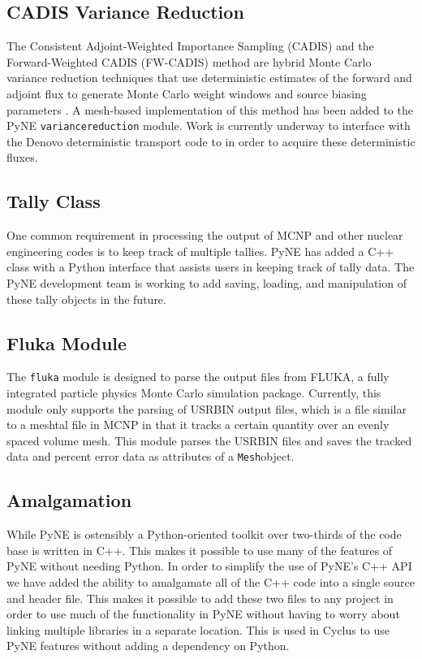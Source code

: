 \documentclass{anstrans}
\newcommand{\Mesh}{\texttt{Mesh}}
\begin{document}
\subsection{CADIS Variance Reduction}

The Consistent Adjoint-Weighted Importance Sampling (CADIS) and the
Forward-Weighted CADIS (FW-CADIS) method are hybrid Monte Carlo variance reduction
techniques that use deterministic estimates of the forward and adjoint flux to
generate Monte Carlo weight windows and source biasing parameters
\cite{haghighat_monte_2003}. A mesh-based implementation of this method has
been added to the PyNE \texttt{variancereduction} module. Work is currently
underway to interface with the Denovo \cite{Evans2010} deterministic transport
code to in order to acquire these deterministic fluxes.


\subsection{Tally Class}

One common requirement in processing the output of MCNP and other nuclear
engineering codes is to keep track of multiple tallies. PyNE has added a
C++ class with a Python interface that assists users in keeping track of
tally data. The PyNE development team is working to add saving, loading,
and manipulation of these tally objects in the future.

\subsection{Fluka Module}

The \texttt{fluka} module is designed to parse the output files from FLUKA, a fully 
integrated particle physics Monte Carlo simulation package\cite{fluka07}. Currently, 
this module only supports the parsing of USRBIN output files, which is 
a file similar to a meshtal file in MCNP in that it tracks a certain 
quantity over an evenly spaced volume mesh. This module parses the USRBIN 
files and saves the tracked data and percent error data as attributes of 
a \Mesh object.

\subsection{Amalgamation}

While PyNE is ostensibly a Python-oriented toolkit over two-thirds 
of the code base is written in C++. This makes it possible to use many 
of the features of PyNE without needing Python. In order to simplify 
the use of PyNE's C++ API we have added the ability to amalgamate all 
of the C++ code into a single source and header file. This makes it 
possible to add these two files to any project in order to use much of the 
functionality in PyNE without having to worry about linking multiple 
libraries in a separate location. This is used in Cyclus 
\cite{carlsen_cyclus_2014} to use PyNE features without adding a dependency on 
Python.
\end{document}
